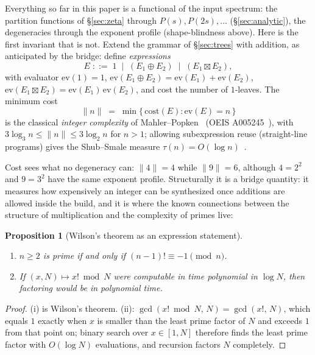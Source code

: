 \documentclass[11pt]{article}
\numberwithin{equation}{section}
\theoremstyle{plain}
\newtheorem{proposition}[theorem]{Proposition}
\theoremstyle{definition}
\theoremstyle{remark}
\begin{document}
Everything so far in this paper is a functional of the input spectrum: the partition
functions of \S\ref{sec:zeta} through $P(s), P(2s), \dots$ (\S\ref{sec:analytic}),
the degeneracies through the exponent profile (shape-blindness above). Here is the
first invariant that is not.
Extend the grammar of \S\ref{sec:trees} with addition, as anticipated by the bridge:
define \emph{expressions}
\[
E \;::=\; 1 \;\mid\; (E_1 \oplus E_2) \;\mid\; (E_1 \boxtimes E_2),
\]
with evaluator $\mathrm{ev}(1) = 1$,
$\mathrm{ev}(E_1 \oplus E_2) = \mathrm{ev}(E_1) + \mathrm{ev}(E_2)$,
$\mathrm{ev}(E_1 \boxtimes E_2) = \mathrm{ev}(E_1)\,\mathrm{ev}(E_2)$, and cost the
number of $1$-leaves. The minimum cost
\[
\|n\| \;=\; \min\{\,\mathrm{cost}(E) : \mathrm{ev}(E) = n\,\}
\]
is the classical \emph{integer complexity} of Mahler--Popken~\cite{mahlerpopken}
(OEIS A005245~\cite{oeis}), with $3\log_3 n \le \|n\| \le 3\log_2 n$ for $n > 1$;
allowing subexpression reuse (straight-line programs) gives the Shub--Smale measure
$\tau(n) = O(\log n)$~\cite{shubsmale}.

Cost sees what no degeneracy can: $\|4\| = 4$ while $\|9\| = 6$, although $4 = 2^2$
and $9 = 3^2$ have the same exponent profile. Structurally it is a bridge quantity:
it measures how expensively an integer can be synthesized once additions are allowed
inside the build, and it is where the known connections between the structure of
multiplication and the complexity of primes live:

\begin{proposition}[Wilson's theorem as an expression statement]\label{prop:wilson}
\begin{enumerate}
\item[(i)] $n \ge 2$ is prime if and only if $(n-1)! \equiv -1 \pmod n$.
\item[(ii)] If $(x, N) \mapsto x! \bmod N$ were computable in time polynomial in
$\log N$, then factoring would be in polynomial time.
\end{enumerate}
\end{proposition}

\begin{proof}
(i) is Wilson's theorem. (ii): $\gcd(x! \bmod N,\, N) = \gcd(x!,\, N)$, which equals
$1$ exactly when $x$ is smaller than the least prime factor of $N$ and exceeds $1$
from that point on; binary search over $x \in [1, N]$ therefore finds the least prime
factor with $O(\log N)$ evaluations, and recursion factors $N$ completely.
\end{proof}
\end{document}

